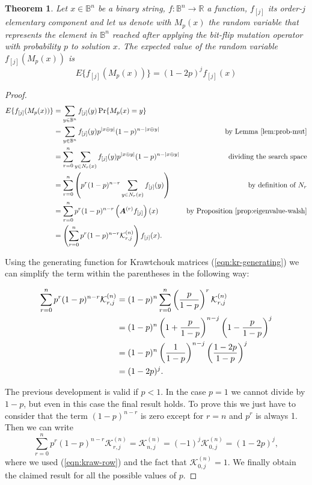 \documentclass{article}
\newtheorem{theorem}{Theorem}
\def\vec#1{\mathchoice{\mbox{\boldmath$\displaystyle#1$}}
  {\mbox{\boldmath$\textstyle#1$}}
  {\mbox{\boldmath$\scriptstyle#1$}}
  {\mbox{\boldmath$\scriptscriptstyle#1$}}}
\newcommand{\Bo}[0]{\mathbb{B}}
\newcommand{\Real}[0]{\mathbb{R}}
\newcommand{\Exp}[1]{E\{#1\}}
\newcommand{\krawel}[3]{\mathcal{K}^{#1}_{#2,#3}}
\newcommand{\Prob}[1]{\mathop{\mathrm{Pr}\{#1\}}}
\begin{document}
\begin{theorem}
\label{thm:mut-exp-elementary}
Let $x \in \Bo^n$ be a binary string, $f:\Bo^n\to \Real$ a function, $f_{[j]}$ its order-$j$ elementary component and let us denote with $M_p(x)$ the random variable that represents the element in $\Bo^n$ reached after applying the bit-flip mutation operator with probability $p$ to solution $x$. The expected value of the random variable $f_{[j]}(M_p(x))$ is
\begin{equation}
\label{eqn:mut-exp-elementary}
\Exp{f_{[j]}(M_p(x))} = (1-2p)^j f_{[j]}(x)
\end{equation}
\end{theorem}
\begin{proof}
\begin{align}
\Exp{f_{[j]}(M_p(x))} &= \sum_{y \in \Bo^n} f_{[j]}(y) \Prob{M_p(x)=y} \notag \\
&= \sum_{y \in \Bo^n} f_{[j]}(y) p^{|x\oplus y|}(1-p)^{n-|x\oplus y|} & \text{by Lemma~\ref{lem:prob-mut}} \notag \\
&= \sum_{r=0}^{n} \sum_{y \in N_r(x)} f_{[j]}(y) p^{|x\oplus y|}(1-p)^{n-|x\oplus y|} & \text{dividing the search space} \notag \\
&= \sum_{r=0}^{n} \left( p^{r}(1-p)^{n-r} \sum_{y \in N_r(x)} f_{[j]}(y) \right) & \text{by definition of $N_r$} \notag \\
&= \sum_{r=0}^{n} p^{r}(1-p)^{n-r} \left( \vec{A}^{(r)} f_{[j]} \right)(x) & \text{by Proposition~\ref{prop:eigenvalue-walsh}} \notag \\
&= \left(\sum_{r=0}^{n} p^{r}(1-p)^{n-r} \krawel{(n)}{r}{j}\right) f_{[j]}(x) .
\end{align}

Using the generating function for Krawtchouk matrices (\ref{eqn:kr-generating}) we can simplify the term within the parentheses in the following way:

\begin{align}
\sum_{r=0}^{n} p^{r}(1-p)^{n-r} \krawel{(n)}{r}{j} &= (1-p)^{n} \sum_{r=0}^n \left(\frac{p}{1-p}\right)^r  \krawel{(n)}{r}{j} \notag \\
&=(1-p)^n   \left(1+\frac{p}{1-p}\right)^{n-j} \left(1-\frac{p}{1-p}\right)^j \notag \\
&=(1-p)^n   \left(\frac{1}{1-p}\right)^{n-j} \left(\frac{1-2p}{1-p}\right)^j \notag \\
&=(1-2p)^j.
\end{align}

The previous development is valid if $p < 1$. In the case $p=1$ we cannot divide by $1-p$, but even in this case the final result holds. To prove this we just have to consider that the term $(1-p)^{n-r}$ is zero except for $r=n$ and $p^r$ is always 1. Then we can write
\begin{equation}
\sum_{r=0}^{n} p^{r}(1-p)^{n-r} \krawel{(n)}{r}{j} = \krawel{(n)}{n}{j} = (-1)^j \krawel{(n)}{0}{j} = (1-2p)^j,
\end{equation}
where we used (\ref{eqn:kraw-row}) and the fact that $\krawel{(n)}{0}{j}=1$. We finally obtain the claimed result for all the possible values of $p$.
\end{proof}
\end{document}
